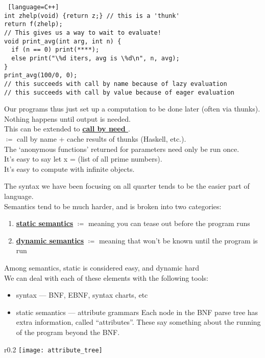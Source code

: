 \documentclass[../../lecture_notes.tex]{subfiles}
\begin{document}
\begin{enumerate} [itemsep=0mm]
\begin{lstlisting} [language=C++]
int zhelp(void) {return z;} // this is a 'thunk'
return f(zhelp);
// This gives us a way to wait to evaluate!
void print_avg(int arg, int n) {
  if (n == 0) print(****);
  else print("\%d iters, avg is \%d\n", n, avg);
}
print_avg(100/0, 0); 
// this succeeds with call by name because of lazy evaluation
// this succeeds with call by value because of eager evaluation
		\end{lstlisting}
		Our programs thus just set up a computation to be done later (often via thunks).\\
		Nothing happens until output is needed.\\
		This can be extended to \textbf{\underline{call by need }}.\\
		$\coloneqq$ call by name + cache results of thunks (Haskell, etc.).\\
		The ‘anonymous functions’ returned for parameters need only be run once.\\
		It’s easy to say let x = (list of all prime numbers).\\
		It’s easy to compute with infinite objects.\\
\end{enumerate} \smallskip

The syntax we have been focusing on all quarter tends to be the easier part of language.\\
Semantics tend to be much harder, and is broken into two categories: \begin{enumerate} [itemsep=0mm]
	\item \textbf{\underline{static semantics}} $\coloneqq$ meaning you can tease out before the program runs
	\item \textbf{\underline{dynamic semantics}} $\coloneqq$ meaning that won’t be known until the program is run
\end{enumerate}
\noindent Among semantics, static is considered easy, and dynamic hard
\\
We can deal with each of these elements with the following tools:
\begin{itemize} [itemsep=0mm]
	\item syntax — BNF, EBNF, syntax charts, etc
	\item static semantics — attribute grammars
		Each node in the BNF parse tree has extra information, called “attributes”.
		These say something about the running of the program beyond the BNF.
\end{itemize}

\begin{wrapfigure}{r}{0.2\textwidth}
	\texttt{[image: attribute\_tree]}
	\label{fig:test}
\end{wrapfigure}
\end{document}
